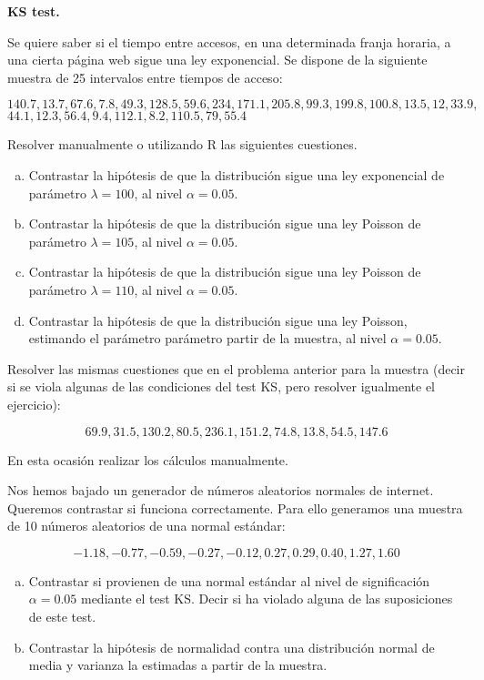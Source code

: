 \documentclass[12pt]{article}
\begin{document}
\textbf{KS test.}

\begin {prob} Se quiere saber si el tiempo entre accesos, en una determinada franja horaria, a  una cierta página web sigue una ley exponencial. Se dispone de la siguiente muestra de 25 intervalos entre tiempos de acceso:

$140.7,13.7,67.6,7.8,49.3,128.5,59.6,234,171.1,205.8,99.3,199.8,100.8,13.5,12,33.9,$
$44.1,12.3,56.4,9.4,112.1,8.2,110.5,79,55.4$

Resolver manualmente o utilizando R las siguientes cuestiones.

\begin{enumerate}[a)]
\item  Contrastar la hipótesis de que la distribución  sigue una ley exponencial de parámetro $\lambda=100$, al nivel $\alpha=0.05$.
\item  Contrastar la hipótesis de que la distribución  sigue una ley Poisson de parámetro $\lambda=105$, al nivel $\alpha=0.05$.
\item  Contrastar la hipótesis de que la distribución  sigue una ley Poisson de parámetro $\lambda=110$, al nivel $\alpha=0.05$.
\item  Contrastar la hipótesis de que la distribución  sigue una ley Poisson, estimando el parámetro parámetro  partir de la muestra, al nivel $\alpha=0.05$.
\end{enumerate}
\end{prob}

\begin{prob}
Resolver las mismas cuestiones que en el problema anterior para la muestra (decir si se viola algunas de las condiciones del test KS, pero resolver igualmente el ejercicio):

$$69.9,  31.5, 130.2,  80.5, 236.1, 151.2,  74.8,  13.8,  54.5, 147.6$$

En esta ocasión realizar los cálculos manualmente.

\end{prob}

\begin{prob}
 Nos hemos bajado un generador de números aleatorios normales de internet. Queremos contrastar si funciona correctamente. Para ello generamos una muestra de 10 números aleatorios de una normal estándar:

$$ -1.18, -0.77, -0.59, -0.27, -0.12,  0.27,  0.29,  0.40,  1.27,  1.60
$$

\begin{enumerate}[a)]
\item Contrastar si provienen de una normal estándar al nivel de significación $\alpha=0.05$ mediante el test KS. Decir si ha violado alguna de las suposiciones de este test.
\item Contrastar la hipótesis de normalidad contra una distribución normal de media y varianza la estimadas a partir de la muestra.
\end{enumerate}

\end{prob}
\end{document}
